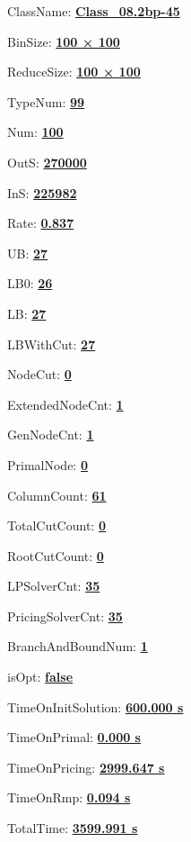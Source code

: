 \documentclass[11pt]{article}
\begin{document}
\pagestyle{empty}


ClassName: \underline{\textbf{Class_08.2bp-45}}
\par
BinSize: \underline{\textbf{100 × 100}}
\par
ReduceSize: \underline{\textbf{100 × 100}}
\par
TypeNum: \underline{\textbf{99}}
\par
Num: \underline{\textbf{100}}
\par
OutS: \underline{\textbf{270000}}
\par
InS: \underline{\textbf{225982}}
\par
Rate: \underline{\textbf{0.837}}
\par
UB: \underline{\textbf{27}}
\par
LB0: \underline{\textbf{26}}
\par
LB: \underline{\textbf{27}}
\par
LBWithCut: \underline{\textbf{27}}
\par
NodeCut: \underline{\textbf{0}}
\par
ExtendedNodeCnt: \underline{\textbf{1}}
\par
GenNodeCnt: \underline{\textbf{1}}
\par
PrimalNode: \underline{\textbf{0}}
\par
ColumnCount: \underline{\textbf{61}}
\par
TotalCutCount: \underline{\textbf{0}}
\par
RootCutCount: \underline{\textbf{0}}
\par
LPSolverCnt: \underline{\textbf{35}}
\par
PricingSolverCnt: \underline{\textbf{35}}
\par
BranchAndBoundNum: \underline{\textbf{1}}
\par
isOpt: \underline{\textbf{false}}
\par
TimeOnInitSolution: \underline{\textbf{600.000 s}}
\par
TimeOnPrimal: \underline{\textbf{0.000 s}}
\par
TimeOnPricing: \underline{\textbf{2999.647 s}}
\par
TimeOnRmp: \underline{\textbf{0.094 s}}
\par
TotalTime: \underline{\textbf{3599.991 s}}
\par
\newpage


\end{document}
